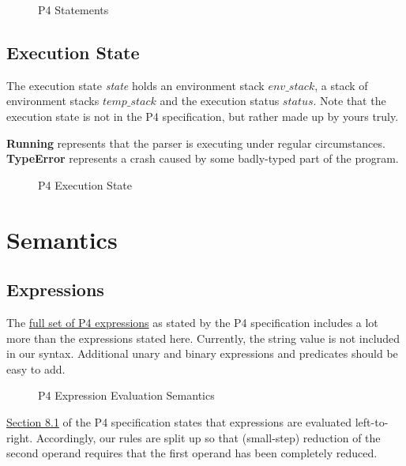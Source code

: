 \documentclass[UTF8]{article}
\begin{document}
%
\begin{figure}[h!]
\centering\ottgrammartabular{
\ottstmt\ottafterlastrule
}
\caption{P4 Statements}
\label{fig:stmt}
\end{figure}

\newpage
\newcommand{\state}{\textit{state}}
\subsection{Execution State}
The execution state \state{} holds an environment stack $\textit{env\_stack}$, a stack of environment stacks $\textit{temp\_stack}$ and the execution status $\textit{status}$. Note that the execution state is not in the P4 specification, but rather made up by yours truly.

\textbf{Running} represents that the parser is executing under regular circumstances. \textbf{TypeError} represents a crash caused by some badly-typed part of the program.

\begin{figure}[h!]
\centering\ottgrammartabular{
\ottstatus\ottinterrule
\ottstate\ottafterlastrule
}
\caption{P4 Execution State}
\label{fig:status}
\end{figure}

\section{Semantics}
\subsection{Expressions}
The \href{https://p4.org/p4-spec/docs/P4-16-v1.2.1.html#sec-exprs}{full set of P4 expressions} as stated by the P4 specification includes a lot more than the expressions stated here. Currently, the string value is not included in our syntax. Additional unary and binary expressions and predicates should be easy to add.

\begin{figure}[h!]
\centering\ottdefnsexpXXsem
\caption{P4 Expression Evaluation Semantics}
\label{fig:semexp}
\end{figure}

\href{https://p4.org/p4-spec/docs/P4-16-v1.2.1.html#sec-expr-eval-order}{Section 8.1} of the P4 specification states that expressions are evaluated left-to-right. Accordingly, our rules are split up so that (small-step) reduction of the second operand requires that the first operand has been completely reduced.
\end{document}
